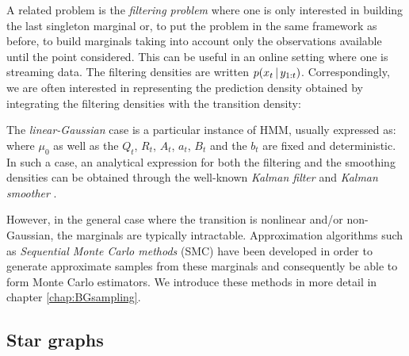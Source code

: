 A related problem is the \emph{filtering problem} where one is only interested in building the last singleton marginal or, to put the problem in the same framework as before, to build marginals taking into account only the observations available until the point considered. This can be useful in an online setting where one is streaming data. 
The filtering densities are written $p(x_t\,|\, y_{1:t})$. Correspondingly, we are often interested in representing the prediction density obtained by integrating the filtering densities with the transition density: 
%
%

The \emph{linear-Gaussian} case is a particular instance of HMM, usually expressed as:
where $\mu_0$ as well as the $Q_t$, $R_t$, $A_t$, $a_t$, $B_t$ and the $b_t$ are fixed and deterministic. In such a case, an analytical expression for both the filtering and the smoothing densities can be obtained through the well-known \emph{Kalman filter} and \emph{Kalman smoother} \citep{anderson79}. 

However, in the general case where the transition is nonlinear and/or non-Gaussian, the marginals are typically intractable. Approximation algorithms such as \emph{Sequential Monte Carlo methods} (SMC) have been developed in order to generate approximate samples from these marginals and consequently be able to form Monte Carlo estimators. We introduce these methods in more detail in chapter \ref{chap:BGsampling}.

\subsection{Star graphs}

